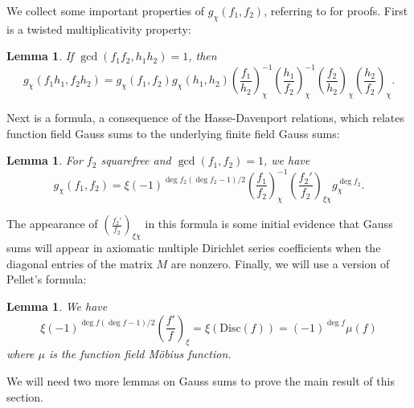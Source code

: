 \documentclass[11pt,letterpaper]{article}
\newtheorem{lemma}[theorem]{Lemma}
\theoremstyle{definition}
\theoremstyle{remark}
\numberwithin{equation}{section}
\theoremstyle{dotless}
\newcommand{\res}[2]{\left(\frac{#1}{#2}\right)}
\begin{document}
We collect some important properties of $g_\chi(f_1, f_2)$, referring to \cite{s-amds} for proofs. First is a twisted multiplicativity property:
\begin{lemma} \label{GaussSumTwistedMult} \cite[Lemma 2.7]{s-amds} 
If $\gcd(f_1f_2, h_1h_2)=1$, then 
\begin{equation*}
g_\chi(f_1h_1, f_2h_2)=g_\chi(f_1, f_2) g_\chi(h_1, h_2) \res{f_1}{h_2}^{-1}_\chi \res{h_1}{f_2}_\chi^{-1} \res{f_2}{h_2}_\chi \res{h_2}{f_2}_\chi.
\end{equation*}
\end{lemma}
\noindent Next is a formula, a consequence of the Hasse-Davenport relations, which relates function field Gauss sums to the underlying finite field Gauss sums:
\begin{lemma} \label{GaussSumLifting} \cite[Lemma 2.4]{s-amds} 
For $f_2$ squarefree and $\gcd(f_1, f_2)=1$, we have
\begin{equation*}
g_\chi(f_1, f_2) = \xi(-1)^{\deg f_2(\deg f_2-1)/2} \res{f_1}{f_2}_\chi^{-1} \res{f_2'}{f_2}_{\xi \chi} g_\chi^{\deg f_2}.
\end{equation*}
\end{lemma}
\noindent The appearance of $\res{f_2'}{f_2}_{\xi \chi}$ in this formula is some initial evidence that Gauss sums will appear in axiomatic multiple Dirichlet series coefficients when the diagonal entries of the matrix $M$ are nonzero. Finally, we will use a version of Pellet's formula:
\begin{lemma} \label{Pellet} \cite[Lemma 2.3]{s-amds} 
We have
\begin{equation*}
\xi(-1)^{\deg f(\deg f -1)/2} \res{f'}{f}_\xi = \xi(\mathrm{Disc}(f))= (-1)^{\deg f} \mu(f)
\end{equation*}
where $\mu$ is the function field M\"{o}bius function.
\end{lemma}

We will need two more lemmas on Gauss sums to prove the main result of this section.
\end{document}
